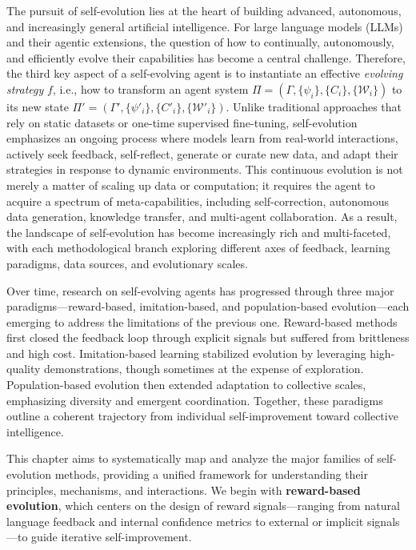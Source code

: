 The pursuit of self-evolution lies at the heart of building advanced, autonomous, and increasingly general artificial intelligence. For large language models (LLMs) and their agentic extensions, the question of how to continually, autonomously, and efficiently evolve their capabilities has become a central challenge. Therefore, the third key aspect of a self-evolving agent is to instantiate an effective \textit{evolving strategy} $f$, i.e., how to transform an agent system $\Pi=(\Gamma,\{\psi_i\}, \{C_i\}, \{\mathcal{W}_i\})$ to its new state $\Pi'=(\Gamma',\{\psi'_i\}, \{C'_i\}, \{\mathcal{W}'_i\})$. Unlike traditional approaches that rely on static datasets or one-time supervised fine-tuning, self-evolution emphasizes an ongoing process where models learn from real-world interactions, actively seek feedback, self-reflect, generate or curate new data, and adapt their strategies in response to dynamic environments. This continuous evolution is not merely a matter of scaling up data or computation; it requires the agent to acquire a spectrum of meta-capabilities, including self-correction, autonomous data generation, knowledge transfer, and multi-agent collaboration. As a result, the landscape of self-evolution has become increasingly rich and multi-faceted, with each methodological branch exploring different axes of feedback, learning paradigms, data sources, and evolutionary scales.


Over time, research on self-evolving agents has progressed through three major paradigms—reward-based, imitation-based, and population-based evolution—each emerging to address the limitations of the previous one. 
Reward-based methods first closed the feedback loop through explicit signals but suffered from brittleness and high cost. 
Imitation-based learning stabilized evolution by leveraging high-quality demonstrations, though sometimes at the expense of exploration. 
Population-based evolution then extended adaptation to collective scales, emphasizing diversity and emergent coordination. 
Together, these paradigms outline a coherent trajectory from individual self-improvement toward collective intelligence.



This chapter aims to systematically map and analyze the major families of self-evolution methods, providing a unified framework for understanding their principles, mechanisms, and interactions. We begin with \textbf{reward-based evolution}, which centers on the design of reward signals—ranging from natural language feedback and internal confidence metrics to external or implicit signals—to guide iterative self-improvement. 

